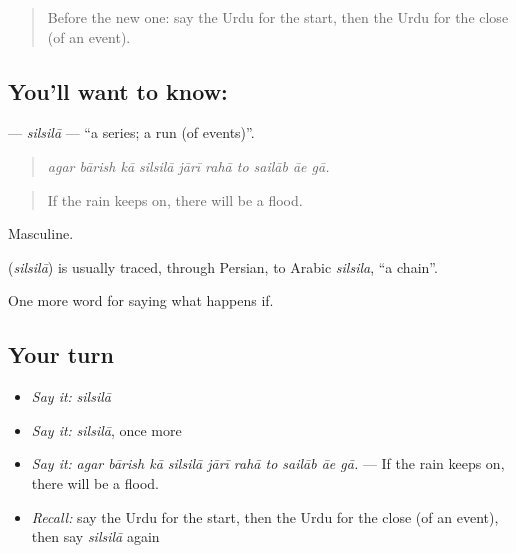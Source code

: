 \label{lesson:UR-C544-silsila}



\begin{quote}
Before the new one: say the Urdu for the start, then the Urdu for the close (of an event).
\end{quote}

\subsection*{You'll want to know: }
\textbf{} — \emph{silsilā} — \textquotedblleft{}a series; a run (of events)\textquotedblright{}.

\begin{quote}
         
\end{quote}

\begin{quote}
\emph{agar bārish kā silsilā jārī rahā to sailāb āe gā.}
\end{quote}

\begin{quote}
If the rain keeps on, there will be a flood.
\end{quote}

Masculine.

\begin{cousinweb}
\textbf{} (\emph{silsilā}) is usually traced, through Persian, to Arabic \emph{silsila}, \textquotedblleft{}a chain\textquotedblright{}.
\end{cousinweb}

\begin{grammarlens}[title={What you've built}]
One more word for saying what happens if.
\end{grammarlens}

\subsection*{Your turn}
\begin{itemize}
\raggedright
  \item \emph{Say it:} \emph{silsilā}
  \item \emph{Say it:} \emph{silsilā}, once more
  \item \emph{Say it:} \emph{agar bārish kā silsilā jārī rahā to sailāb āe gā.} — If the rain keeps on, there will be a flood.
  \item \emph{Recall:} say the Urdu for the start, then the Urdu for the close (of an event), then say \emph{silsilā} again
\end{itemize}

